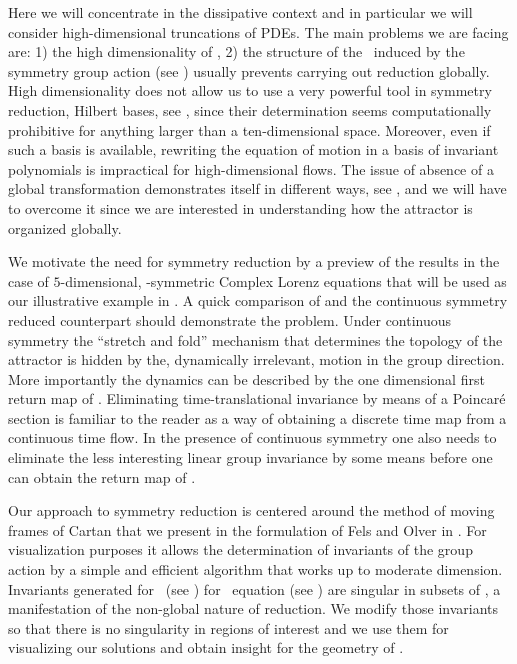 Here we will concentrate in the dissipative context and in particular we will consider high-dimensional truncations
of PDEs. The main problems we are facing are: 1) the high dimensionality of \statesp, 2) the structure of
the \statesp\ induced by the symmetry group action (see )
usually prevents carrying out reduction globally.
High dimensionality does not allow us to use a very powerful tool in symmetry reduction, Hilbert bases,
see , since their determination seems computationally prohibitive for anything larger
than a ten-dimensional space. Moreover, even if such a basis is available,
rewriting the equation of motion in a basis of invariant polynomials is impractical for high-dimensional
flows. The issue of absence of  a global transformation demonstrates itself in different
ways, see , and we will have to overcome it since we are interested in understanding
how the attractor is organized globally.

We motivate the need for symmetry reduction by a preview of the results in the case of $5$-dimensional,
-symmetric Complex Lorenz equations that will be used as our illustrative example in .
 A quick comparison of
 and the continuous symmetry reduced  counterpart should demonstrate the problem.
Under continuous symmetry the ``stretch and fold'' mechanism that determines the topology of the attractor
is hidden by the, dynamically irrelevant, motion in the group direction. More importantly the dynamics can
be described by the one dimensional first return map of . Eliminating time-translational
invariance by means of a Poincar\'e section is familiar to the reader as a way of obtaining a discrete time map from
a continuous time flow. In the presence of continuous symmetry one also needs to eliminate the less interesting
linear group invariance by some means before one can obtain the return map of .

Our approach to symmetry reduction is centered around the method of moving frames of Cartan 
that we present in the formulation of Fels and Olver  in . For visualization
purposes it allows the determination of invariants of the group action by a simple
and efficient algorithm that works up to moderate dimension.
Invariants generated for \CLe\ (see ) for \KS\ equation
(see ) are singular in subsets of \statesp, a manifestation of the non-global
nature of reduction. We modify those invariants so that there is
no singularity in regions of interest and we use them for visualizing our solutions and obtain insight
for the geometry of \statesp.

